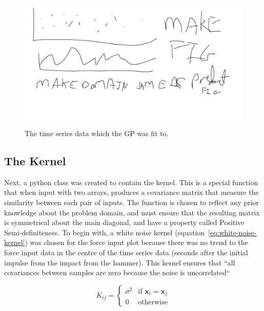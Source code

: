 \documentclass[12pt]{article}
\begin{document}
    \begin{figure}[htbp]
        \centering
        \includegraphics[width=1.0\linewidth]{figures/input-response-plot/input-response-plot.png}
        \caption{The time series data which the GP was fit to.}
        \label{fig:input-response-plot}
    \end{figure}



    \subsection{The Kernel}
    Next, a python class was created to contain the kernel.
    This is a special function that when input with two arrays, produces a covariance matrix that measure the similarity between each pair of inputs.
    The function is chosen to reflect any prior knowledge about the problem domain, and must ensure that the resulting matrix is symmetrical about the main diagonal, and have a property called Positive Semi-definiteness.
    To begin with, a white noise kernel (equation~\ref{eq:white-noise-kernel}) was chosen for the force input plot because there was no trend to the force input data in the centre of the time series data (seconds after the initial impulse from the impact from the hammer).
    This kernel ensures that ``all covariances between samples are zero because the noise is uncorrelated``~\cite{RoelantsGPKernels}

    \begin{equation}
        K_{ij} =
        \begin{cases}
            \sigma^2 & \text{if } \mathbf{x}_i = \mathbf{x}_j \\
            0 & \text{otherwise}
        \end{cases}\label{eq:white-noise-kernel}
    \end{equation}
\end{document}
